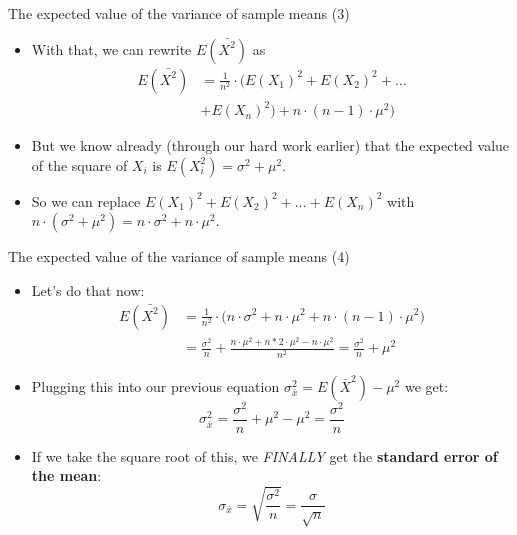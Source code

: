 \begin{frame}{The expected value of the variance of sample means (3)}

\begin{itemize}
\itemsep1pt\parskip0pt
\item
  With that, we can rewrite \(E(\bar{X^2})\) as \[
  \begin{aligned}
  E(\bar{X^2}) &= \frac{1}{n^2}\cdot \Big(E(X_1)^2 + E(X_2)^2 + \dots \\
           &+ E(X_n)^2) + n \cdot (n-1)\cdot \mu^2\Big)
  \end{aligned}\]
\item
  But we know already (through our hard work earlier) that the expected
  value of the square of \(X_i\) is \(E(X_i^2) = \sigma^2 + \mu^2\).
\item
  So we can replace \(E(X_1)^2 + E(X_2)^2 + \dots + E(X_n)^2\) with
  \(n\cdot(\sigma^2 + \mu^2) = n\cdot \sigma^2 + n\cdot \mu^2\).
\end{itemize}

\end{frame}

\begin{frame}{The expected value of the variance of sample means (4)}

\begin{itemize}
\itemsep1pt\parskip0pt
\item
  Let's do that now: \[
  \begin{aligned}
  E(\bar{X^2}) &= \frac{1}{n^2}\cdot \Big(n\cdot \sigma^2 + n\cdot \mu^2+ n \cdot (n-1)\cdot \mu^2\Big)\\
           &= \frac{\sigma^2}{n}+\frac{n\cdot \mu^2+n*2\cdot\mu^2-n\cdot\mu^2}{n^2} = \frac{\sigma^2}{n}+\mu^2
  \end{aligned}\]
\item
  Plugging this into our previous equation
  \(\sigma_{\bar{x}}^2 = E(\bar{X}^2) - \mu^2\) we get:
  \[\sigma_{\bar{x}}^2 = \frac{\sigma^2}{n}+\mu^2 - \mu^2 = \frac{\sigma^2}{n}\]
\item
  If we take the square root of this, we \emph{FINALLY} get the
  \textbf{standard error of the mean}:
  \[\sigma_{\bar{x}} = \sqrt{\frac{\sigma^2}{n}} = \frac{\sigma}{\sqrt{n}}\]
\end{itemize}

\end{frame}

